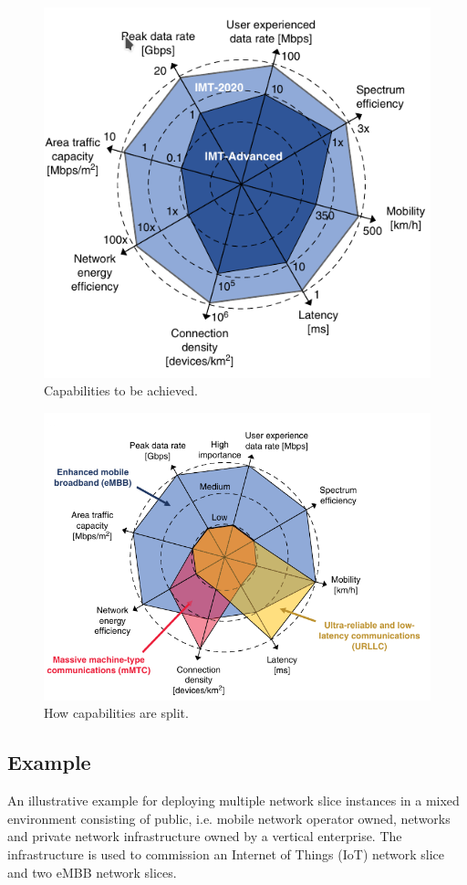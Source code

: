 \documentclass{article}
\begin{document}
\begin{figure}[h]
\centering
\includegraphics[scale=0.65]{pics/capabilities1.png}
\caption{Capabilities to be achieved.} 
\label{cap1}
\end{figure}
\begin{figure}[h]
\centering
\includegraphics[scale=0.5]{pics/capabilities2.png}
\caption{How capabilities are split.} 
\label{cap2}
\end{figure}


\subsection{Example}
An illustrative example for deploying multiple network slice instances in a
mixed environment consisting of public, i.e. mobile network operator owned, networks and
private network infrastructure owned by a vertical enterprise. The infrastructure is used to commission an Internet of Things (IoT) network slice and two eMBB network slices. 
\end{document}
